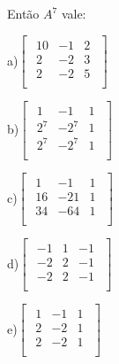 \documentclass{article}
\begin{document}
\begin{enumerate}
Então $A^7$ vale:


a)$
 \left [ \begin{matrix} 
    \begin{array}{cccc}
    10 & -1 & 2  \\
    2 & -2 & 3  \\
    2 & -2 & 5  \\
\end{array}
\end{matrix} \right ]$ \newline 

b)$
 \left [ \begin{matrix} 
    \begin{array}{cccc}
    1 & -1 & 1  \\
    2^7 & -2^7 & 1  \\
    2^7 & -2^7 & 1  \\
\end{array}
\end{matrix} \right ]$ \newline 


c)$
\left [ \begin{matrix} 
    \begin{array}{cccc}
    1 & -1 & 1  \\
    16 & -21 & 1  \\
    34 & -64 & 1  \\
\end{array}
\end{matrix} \right ]$ \newline 


d)$
\left [ \begin{matrix} 
    \begin{array}{cccc}
    -1 & 1 & -1  \\
    -2 & 2 & -1  \\
    -2 & 2 & -1  \\
\end{array}
\end{matrix} \right ]$ \newline 

e)$
\left [ \begin{matrix} 
    \begin{array}{cccc}
    1 & -1 & 1  \\
    2 & -2 & 1  \\
    2 & -2 & 1  \\
\end{array}
\end{matrix} \right ]$ \newline 








\end{enumerate}
\end{document}
